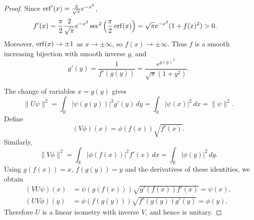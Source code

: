 \documentclass{techbrief}
\begin{document}
\begin{proof}
	Since $\operatorname{erf}'(x)=\frac{2}{\sqrt{\pi}}e^{-x^2}$,
	\begin{equation*}
		\begin{aligned}
			f'(x)
			&=\frac{\pi}{2}\frac{2}{\sqrt{\pi}}e^{-x^2}
			\sec^2\left(\frac{\pi}{2}\operatorname{erf}(x)\right)=\sqrt{\pi}e^{-x^2}(1+f(x)^2)>0.
		\end{aligned}
	\end{equation*}
	Moreover, $\operatorname{erf}(x)\to\pm1$ as $x\to\pm\infty$, so
	$f(x)\to\pm\infty$. Thus $f$ is a smooth increasing
	bijection with smooth inverse $g$, and
	\begin{equation*}
		g'(y)=\frac{1}{f'(g(y))}
		=\frac{e^{g(y)^2}}{\sqrt{\pi}(1+y^2)}.
	\end{equation*}
	
	The change of variables $x=g(y)$ gives
	\begin{equation*}
		\|U\psi\|^2
		=\int_{\mathbb{R}}|\psi(g(y))|^2g'(y)\,dy
		=\int_{\mathbb{R}}|\psi(x)|^2\,dx
		=\|\psi\|^2.
	\end{equation*}
	Define
	\begin{equation*}
		(V\phi)(x)=\phi(f(x))\sqrt{f'(x)}.
	\end{equation*}
	Similarly,
	\begin{equation*}
		\|V\phi\|^2
		=\int_{\mathbb{R}}|\phi(f(x))|^2f'(x)\,dx
		=\int_{\mathbb{R}}|\phi(y)|^2\,dy.
	\end{equation*}
	Using $g(f(x))=x$, $f(g(y))=y$ and the derivatives
	of these identities, we obtain
	\begin{equation*}
		\begin{aligned}
			(VU\psi)(x)
			&=\psi(g(f(x)))\sqrt{g'(f(x))f'(x)}
			=\psi(x),\\
			(UV\phi)(y)
			&=\phi(f(g(y)))\sqrt{f'(g(y))g'(y)}
			=\phi(y).
		\end{aligned}
	\end{equation*}
	Therefore $U$ is a linear isometry with inverse $V$,
	and hence is unitary.
	

\end{proof}
\end{document}
